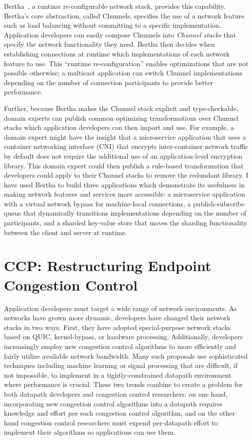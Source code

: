 Bertha~\cite{bertha-hotnets, bertha}, a runtime re-configurable network stack, provides this capability. 
Bertha's core abstraction, called Chunnels, specifies the use of a network feature such as load balancing without committing to a specific implementation. Application developers can easily compose Chunnels into \emph{Chunnel stacks} that specify the network functionality they need.
Bertha then decides when establishing connections at runtime which implementations of each network feature to use. This ``runtime re-configuration'' enables optimizations that are not possible otherwise; \eg a multicast application can switch Chunnel implementations depending on the number of connection participants to provide better performance.

Further, because Bertha makes the Chunnel stack explicit and type-checkable, domain experts can publish common optimizing transformations over Chunnel stacks which application developers can then import and use. 
For example, a domain expert might have the insight that a microservice application that uses a container networking interface (CNI) that encrypts inter-container network traffic by default does not require the additional use of an application-level encryption library. 
This domain expert could then publish a rule-based transformation that developers could apply to their Chunnel stacks to remove the redundant library.
I have used Bertha to build three applications which demonstrate its usefulness in making network features and services more accessible: a microservice application with a virtual network bypass for machine-local connections, a publish-subscribe queue that dynamically transitions implementations depending on the number of participants, and a sharded key-value store that moves the sharding functionality between the client and server at runtime.

\section{CCP: Restructuring Endpoint Congestion Control}

Application developers must target a wide range of network environments. As networks have grown more dynamic, developers have changed their network stacks in two ways.
First, they have adopted special-purpose network stacks based on QUIC, kernel-bypass, or hardware processing.
Additionally, developers increasingly employ new congestion control algorithms to more efficiently and fairly utilize available network bandwidth. Many such proposals use sophisticated techniques including machine learning or signal processing that are difficult, if not impossible, to implement in a tightly-constrained datapath environment where performance is crucial. 
These two trends combine to create a problem for both datapath developers and congestion control researchers: on one hand, incorporating new congestion control algorithms into a datapath requires knowledge and effort per each congestion control algorithm, and on the other hand congestion control researchers must expend per-datapath effort to implement their algorithms so applications can use them.

